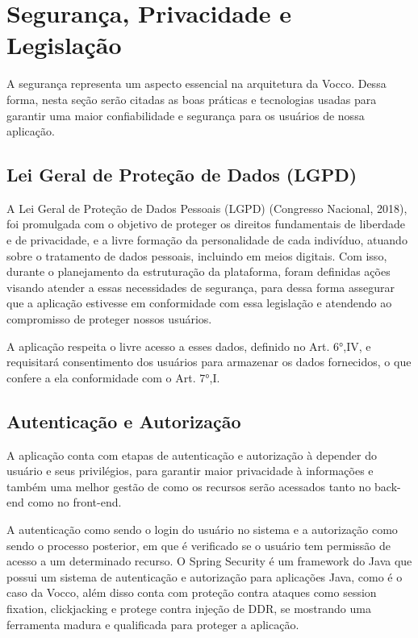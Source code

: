 \section{Segurança, Privacidade e Legislação}
A segurança representa um aspecto essencial na arquitetura da Vocco. Dessa forma, nesta seção serão citadas as boas práticas e tecnologias usadas para garantir uma maior confiabilidade e segurança para os usuários de nossa aplicação.

\subsection{Lei Geral de Proteção de Dados (LGPD)}
A Lei Geral de Proteção de Dados Pessoais (LGPD) (Congresso Nacional, 2018), foi promulgada com o objetivo de proteger os direitos fundamentais de liberdade e de privacidade, e a livre formação da personalidade de cada indivíduo, atuando sobre o tratamento de dados pessoais, incluindo em meios digitais.
Com isso, durante o planejamento da estruturação da plataforma, foram definidas ações visando atender a essas necessidades de segurança, para dessa forma assegurar que a aplicação estivesse em conformidade com essa legislação e atendendo ao compromisso de proteger nossos usuários.

A aplicação respeita o livre acesso a esses dados, definido no Art. 6°,IV, e requisitará consentimento dos usuários para armazenar os dados fornecidos, o que confere a ela conformidade com o Art. 7°,I.


\subsection{Autenticação e Autorização}
A aplicação conta com etapas de autenticação e autorização à depender do usuário e seus privilégios, para garantir maior privacidade à informações e também uma melhor gestão de como os recursos serão acessados tanto no back-end como no front-end.

A autenticação como sendo o login do usuário no sistema e a autorização como sendo o processo posterior, em que é verificado se o usuário tem permissão de acesso a um determinado recurso.
O Spring Security é um framework do Java que possui um sistema  de autenticação e autorização para aplicações Java, como é o caso da Vocco, além disso conta com proteção contra ataques como session fixation, clickjacking e protege contra injeção de DDR, se mostrando uma ferramenta madura e qualificada para proteger a aplicação.

